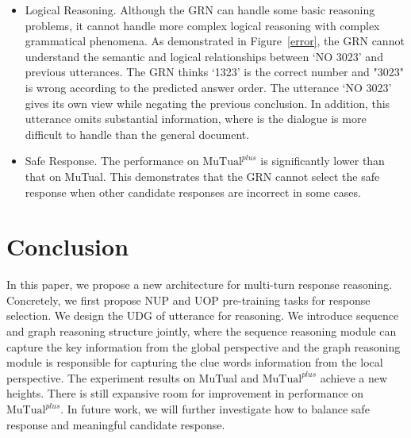 \documentclass[letterpaper]{article} %
\begin{document}
\begin{itemize}
    \item Logical Reasoning. Although the GRN can handle some basic reasoning problems, it cannot handle more complex logical reasoning with complex grammatical phenomena. As demonstrated in Figure~\ref{error}, the GRN cannot understand the semantic and logical relationships between `NO 3023' and previous utterances. The GRN thinks `1323' is the correct number and "3023" is wrong according to the predicted answer order. The utterance `NO 3023' gives its own view while negating the previous conclusion. In addition, this utterance omits substantial information, where is the dialogue is more difficult to handle than the general document.
    \item Safe Response. The performance on $\text{MuTual}^{plus}$ is significantly lower than that on MuTual. This demonstrates that the GRN cannot select the safe response when other candidate responses are incorrect in some cases.
\end{itemize}

\section{Conclusion}
In this paper, we propose a new architecture for multi-turn response reasoning. Concretely, we first propose NUP and UOP pre-training tasks for response selection. We design the UDG of utterance for reasoning. We introduce sequence and graph reasoning structure jointly, where the sequence reasoning module can capture the key information from the global perspective and the graph reasoning module is responsible for capturing the clue words information from the local perspective. The experiment results on MuTual and $\text{MuTual}^{plus}$ achieve a new heights. There is still expansive room for improvement in performance on $\text{MuTual}^{plus}$. In future work, we will further investigate how to balance safe response and meaningful candidate response.
\end{document}
